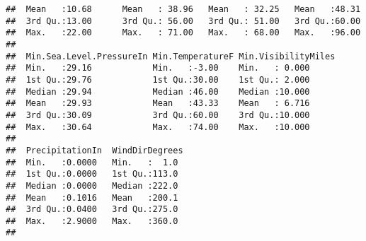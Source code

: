 \documentclass[]{article}
\newenvironment{Shaded}{\begin{snugshade}}{\end{snugshade}}
\newcommand{\KeywordTok}[1]{\textcolor[rgb]{0.13,0.29,0.53}{\textbf{#1}}}
\newcommand{\StringTok}[1]{\textcolor[rgb]{0.31,0.60,0.02}{#1}}
\newcommand{\CommentTok}[1]{\textcolor[rgb]{0.56,0.35,0.01}{\textit{#1}}}
\newcommand{\OperatorTok}[1]{\textcolor[rgb]{0.81,0.36,0.00}{\textbf{#1}}}
\newcommand{\NormalTok}[1]{#1}
\begin{document}
\begin{verbatim}
##  Mean   :10.68      Mean   : 38.96   Mean   : 32.25   Mean   :48.31  
##  3rd Qu.:13.00      3rd Qu.: 56.00   3rd Qu.: 51.00   3rd Qu.:60.00  
##  Max.   :22.00      Max.   : 71.00   Max.   : 68.00   Max.   :96.00  
##                                                                      
##  Min.Sea.Level.PressureIn Min.TemperatureF Min.VisibilityMiles
##  Min.   :29.16            Min.   :-3.00    Min.   : 0.000     
##  1st Qu.:29.76            1st Qu.:30.00    1st Qu.: 2.000     
##  Median :29.94            Median :46.00    Median :10.000     
##  Mean   :29.93            Mean   :43.33    Mean   : 6.716     
##  3rd Qu.:30.09            3rd Qu.:60.00    3rd Qu.:10.000     
##  Max.   :30.64            Max.   :74.00    Max.   :10.000     
##                                                               
##  PrecipitationIn  WindDirDegrees 
##  Min.   :0.0000   Min.   :  1.0  
##  1st Qu.:0.0000   1st Qu.:113.0  
##  Median :0.0000   Median :222.0  
##  Mean   :0.1016   Mean   :200.1  
##  3rd Qu.:0.0400   3rd Qu.:275.0  
##  Max.   :2.9000   Max.   :360.0  
## 
\end{verbatim}

\begin{Shaded}
\end{Shaded}
\end{document}
